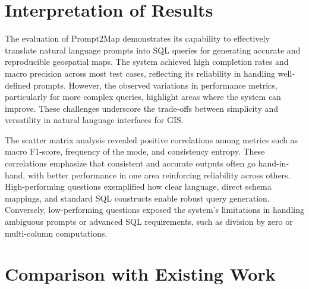 


\section{Interpretation of Results}

The evaluation of Prompt2Map demonstrates its capability to effectively translate natural language prompts into SQL queries for generating accurate and reproducible geospatial maps. The system achieved high completion rates and macro precision across most test cases, reflecting its reliability in handling well-defined prompts. However, the observed variations in performance metrics, particularly for more complex queries, highlight areas where the system can improve. These challenges underscore the trade-offs between simplicity and versatility in natural language interfaces for GIS.

The scatter matrix analysis revealed positive correlations among metrics such as macro F1-score, frequency of the mode, and consistency entropy. These correlations emphasize that consistent and accurate outputs often go hand-in-hand, with better performance in one area reinforcing reliability across others. High-performing questions exemplified how clear language, direct schema mappings, and standard SQL constructs enable robust query generation. Conversely, low-performing questions exposed the system's limitations in handling ambiguous prompts or advanced SQL requirements, such as division by zero or multi-column computations.

\section{Comparison with Existing Work}

